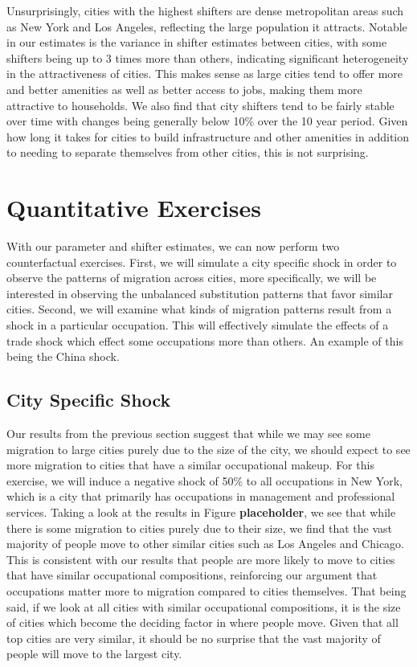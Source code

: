 \documentclass[10pt]{article}
\begin{document}
Unsurprisingly, cities with the highest shifters are dense metropolitan areas such as New York and Los Angeles, reflecting the large population it attracts. Notable in our estimates is the variance in shifter estimates between cities, with some shifters being up to 3 times more than others, indicating significant heterogeneity in the attractiveness of cities. This makes sense as large cities tend to offer more and better amenities as well as better access to jobs, making them more attractive to households. We also find that city shifters tend to be fairly stable over time with changes being generally below 10\% over the 10 year period. Given how long it takes for cities to build infrastructure and other amenities in addition to needing to separate themselves from other cities, this is not surprising.

\section{Quantitative Exercises}

With our parameter and shifter estimates, we can now perform two counterfactual exercises. First, we will simulate a city specific shock in order to observe the patterns of migration across cities, more specifically, we will be interested in observing the unbalanced substitution patterns that favor similar cities. Second, we will examine what kinds of migration patterns result from a shock in a particular occupation. This will effectively simulate the effects of a trade shock which effect some occupations more than others. An example of this being the China shock.

\subsection{City Specific Shock}

Our results from the previous section suggest that while we may see some migration to large cities purely due to the size of the city, we should expect to see more migration to cities that have a similar occupational makeup. For this exercise, we will induce a negative shock of 50\% to all occupations in New York, which is a city that primarily has occupations in management and professional services. Taking a look at the results in Figure \textbf{placeholder}, we see that while there is some migration to cities purely due to their size, we find that the vast majority of people move to other similar cities such as Los Angeles and Chicago. This is consistent with our results that people are more likely to move to cities that have similar occupational compositions, reinforcing our argument that occupations matter more to migration compared to cities themselves. That being said, if we look at all cities with similar occupational compositions, it is the size of cities which become the deciding factor in where people move. Given that all top cities are very similar, it should be no surprise that the vast majority of people will move to the largest city.
\end{document}
